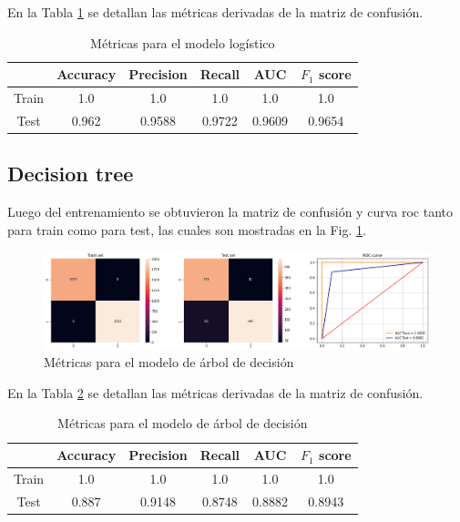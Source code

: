   En la Tabla \ref{tabla.lr} se detallan las métricas derivadas de la matriz de confusión. 

\begin{table}[H]
\centering
\begin{tabular}{|c|c|c|c|c|c|}
\hline
      & Accuracy & Precision & Recall & AUC    & $F_1$ score \\ \hline
Train & 1.0   & 1.0    & 1.0 & 1.0 & 1.0      \\ \hline
Test  & 0.962      & 0.9588    & 0.9722 & 0.9609  & 0.9654      \\ \hline
\end{tabular}
\caption{Métricas para el modelo logístico}
\label{tabla.lr}
\end{table}


\subsection{Decision tree}

Luego del entrenamiento se obtuvieron la matriz de confusión y curva roc tanto para train como para test, las cuales son mostradas en la Fig. \ref{fig.dt}. 

\begin{figure}[H]
\centering
        \includegraphics[width=\linewidth]{chapters/deteccion/images/dt.png}
        \caption{Métricas para el modelo de árbol de decisión}
        \label{fig.dt}
  \end{figure}
  
  En la Tabla \ref{tabla.dt} se detallan las métricas derivadas de la matriz de confusión. 

\begin{table}[H]
\centering
\begin{tabular}{|c|c|c|c|c|c|}
\hline
      & Accuracy & Precision & Recall & AUC    & $F_1$ score \\ \hline
Train & 1.0   & 1.0    & 1.0 & 1.0 & 1.0      \\ \hline
Test  & 0.887      & 0.9148    & 0.8748 & 0.8882  & 0.8943      \\ \hline
\end{tabular}
\caption{Métricas para el modelo de árbol de decisión}
\label{tabla.dt}
\end{table}

